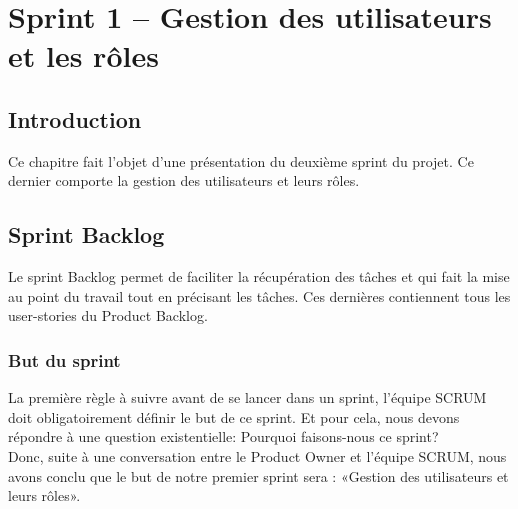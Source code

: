 \chapter{Sprint 1 – Gestion des utilisateurs et les rôles}
	
\section*{Introduction}
Ce chapitre fait l’objet d’une présentation du deuxième sprint du projet. Ce dernier comporte la gestion des utilisateurs et leurs rôles.

\section[Sprint Backlog]{Sprint Backlog}
Le sprint Backlog permet de faciliter la récupération des tâches et qui fait la mise au point du travail tout en précisant les tâches. Ces dernières contiennent tous les user-stories du Product Backlog.
\subsection[But du sprint]{But du sprint}
La première règle à suivre avant de se lancer dans un sprint, l’équipe SCRUM doit obligatoirement définir le but de ce sprint. Et pour cela, nous devons répondre à une question existentielle: Pourquoi faisons-nous ce sprint?\\
Donc, suite à une conversation entre le Product Owner et l’équipe SCRUM, nous avons conclu que le but de notre premier sprint sera : «Gestion des utilisateurs et leurs rôles».
